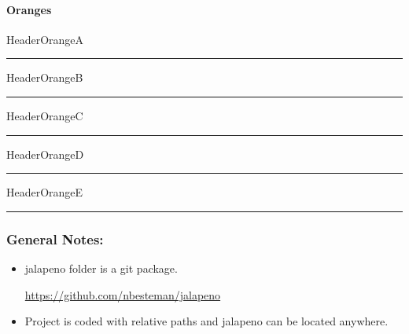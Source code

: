 \documentclass[class=book , crop=false]{standalone}
\begin{document}
\paragraph[Oranges]{Oranges\texorpdfstring{\\}{}}
\textcolor{HeaderOrangeA}{HeaderOrangeA}
\noindent\textcolor{HeaderOrangeA}{\rule{\linewidth}{.5mm}}
\textcolor{HeaderOrangeB}{HeaderOrangeB}
\noindent\textcolor{HeaderOrangeB}{\rule{\linewidth}{.5mm}}
\textcolor{HeaderOrangeC}{HeaderOrangeC}
\noindent\textcolor{HeaderOrangeC}{\rule{\linewidth}{.5mm}}
\textcolor{HeaderOrangeD}{HeaderOrangeD}
\noindent\textcolor{HeaderOrangeD}{\rule{\linewidth}{.5mm}}
\textcolor{HeaderOrangeE}{HeaderOrangeE}
\noindent\textcolor{HeaderOrangeE}{\rule{\linewidth}{.5mm}}
%

\clearpage
\subsubsection{General Notes:}
\begin{itemize}
\item jalapeno folder is a git package.

\href{https://github.com/nbesteman/jalapeno}{https://github.com/nbesteman/jalapeno}

\item Project is coded with relative paths and jalapeno can be located anywhere.

\end{itemize}
\end{document}
